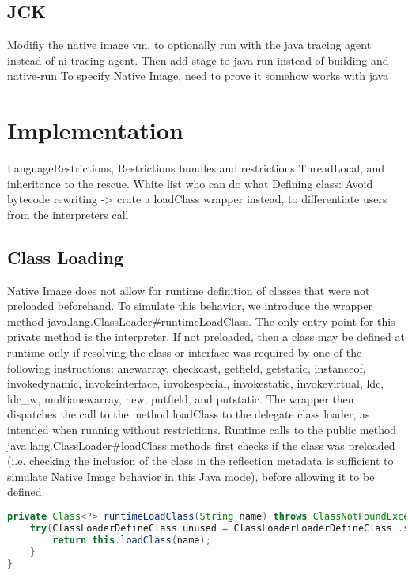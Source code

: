 \section{JCK}
Modifiy the native image vm, to optionally run with the java tracing agent instead of ni tracing agent. Then add stage to java-run instead of building and native-run
To specify Native Image, need to prove it somehow works with java

\chapter{Implementation}

LanguageRestrictions, Restrictions bundles and restrictions
ThreadLocal, and inheritance to the rescue. White list who can do what
Defining class: Avoid bytecode rewriting -> crate a loadClass wrapper instead, to differentiate users from the interpreters call

\section{Class Loading}
Native Image does not allow for runtime definition of classes that were not preloaded beforehand.
To simulate this behavior, we introduce the wrapper method java.lang.ClassLoader#runtimeLoadClass. The only entry point for this private method is the interpreter. If not preloaded, then a class may be defined at runtime only if resolving the class or interface was required by one of the following instructions:
anewarray, checkcast, getfield, getstatic, instanceof, invokedynamic, invokeinterface, invokespecial,
invokestatic, invokevirtual, ldc, ldc\_w, multianewarray, new, putfield, and putstatic.
The wrapper then dispatches the call to the method loadClass to the delegate class loader, as intended when running without restrictions.
Runtime calls to the public method java.lang.ClassLoader#loadClass methods first checks if the class was preloaded (i.e. checking the inclusion of the class in the reflection metadata is sufficient to simulate Native Image behavior in this Java mode), before allowing it to be defined.

\begin{lstlisting}[language=Java]
private Class<?> runtimeLoadClass(String name) throws ClassNotFoundException {
    try(ClassLoaderDefineClass unused = ClassLoaderLoaderDefineClass .setIsRuntimeDefineClassAllowed()) {
        return this.loadClass(name);
    }
}
\end{lstlisting}

